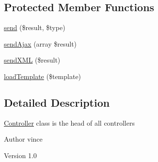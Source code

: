 \subsection*{Protected Member Functions}
\begin{DoxyCompactItemize}
\item 
\hyperlink{class_anemo_1_1_controller_a81d3d1fbaf410923367685f468766513}{send} (\$result, \$type)
\item 
\hyperlink{class_anemo_1_1_controller_a54e05c569278621dedec32bd15e1e381}{sendAjax} (array \$result)
\item 
\hyperlink{class_anemo_1_1_controller_a506eee4f1f61534baae414a0a5319665}{sendXML} (\$result)
\item 
\hyperlink{class_anemo_1_1_controller_a4cc6aa9c5d8239988a1be55b2f855421}{loadTemplate} (\$template)
\end{DoxyCompactItemize}


\subsection{Detailed Description}
\hyperlink{class_anemo_1_1_controller}{Controller} class is the head of all controllers \begin{DoxyAuthor}{Author}
vince 
\end{DoxyAuthor}
\begin{DoxyVersion}{Version}
1.0 
\end{DoxyVersion}


